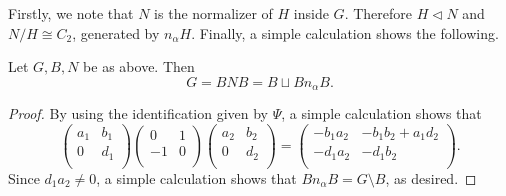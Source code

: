 Firstly, we note that $N$ is the normalizer of $H$ inside $G$. Therefore $H\triangleleft N$ and $N/H\cong C_2$, generated by $n_\alpha H$. Finally, a simple calculation shows the following.

\begin{theorem}
    Let $G,B,N$ be as above. Then 
    $$G=BNB=B\sqcup Bn_\alpha B.$$    
\end{theorem}
\begin{proof}
    By using the identification given by $\Psi$, a simple calculation shows that 
    $$\begin{pmatrix}
        a_1 & b_1\\
        0 & d_1\\
    \end{pmatrix}\begin{pmatrix}
        0 & 1\\
        -1 & 0\\
    \end{pmatrix}\begin{pmatrix}
        a_2 & b_2\\
        0 & d_2\\
    \end{pmatrix}=\begin{pmatrix}
        -b_1a_2 & -b_1b_2+a_1d_2\\
        -d_1a_2 & -d_1b_2\\
    \end{pmatrix}.$$
    Since $d_1a_2\neq 0$, a simple calculation shows that $Bn_\alpha B=G\setminus B$, as desired.
\end{proof}